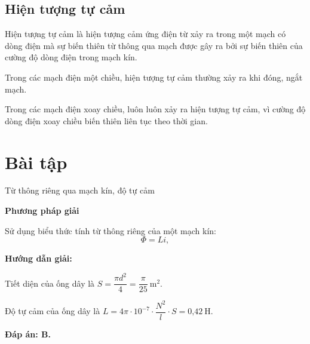 \subsection{Hiện tượng tự cảm}
Hiện tượng tự cảm là hiện tượng cảm ứng điện từ  xảy ra trong một mạch có dòng điện mà sự biến thiên từ thông qua mạch được gây ra bởi sự biến thiên của cường độ dòng điện trong mạch kín.

Trong các mạch điện một chiều, hiện tượng tự cảm thường xảy ra khi đóng, ngắt mạch.

Trong các mạch điện xoay chiều, luôn luôn xảy ra hiện tượng tự cảm, vì cường độ dòng điện xoay chiều biến thiên liên tục theo thời gian.
\section{Bài tập}
\begin{dang}{Từ thông  riêng qua mạch kín, độ tự cảm}
\end{dang}

\textbf{Phương pháp giải}

Sử dụng biểu thức tính từ thông riêng của một mạch kín:
\begin{equation}
\Phi=Li,
\end{equation}


\vspace{1em}
{
{\begin{center}
		\textbf{Hướng dẫn giải:}
\end{center}
	
	Tiết diện của ống dây là $S=\dfrac{\pi d^2}{4}=\dfrac{\pi}{25}\ \text{m}^2$.
	
	Độ tự cảm của ống dây là $L=4\pi \cdot 10^{-7}\cdot \dfrac{N^2}{l}\cdot S=\text{0,42}\ \text{H}$.
	
\textbf{	Đáp án: B.}}
}

